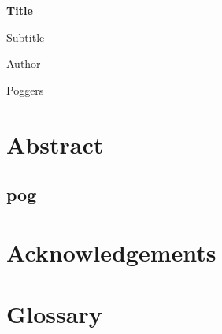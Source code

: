 \documentclass[11pt, a4paper]{article}
\newcommand{\titlevar}{Title}
\newcommand{\mysection}[1]{\pagebreak \section{#1}}
\begin{document}
	
\begin{titlepage}
	\begin{center}
		\vspace*{1cm}
		\Huge
		\textbf{\titlevar}

		\large
		\vspace{0.5cm}
		Subtitle

		\vspace{0.5cm}
		Author

		\vfill
		
		Poggers
	\end{center}

\end{titlepage}
	
\mysection{Abstract}
\subsection{pog}
	
\blindtext

\mysection{Acknowledgements}
\blindtext

\pagebreak
\tableofcontents
\listoffigures

\pagebreak
\mysection{Glossary}

\end{document}
